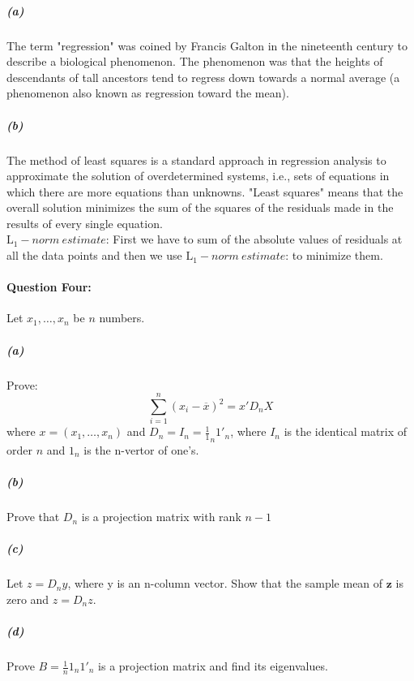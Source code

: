 \documentclass[11pt]{article}
\begin{document}
\paragraph{\color{red}{Answer:}}
  \subparagraph{(a)}
    The term "regression" was coined by Francis Galton in the nineteenth century
    to describe a biological phenomenon. The phenomenon was that the heights of
    descendants of tall ancestors tend to regress down towards a normal average
    (a phenomenon also known as regression toward the mean).
  \subparagraph{(b)}
    The method of least squares is a standard approach in regression analysis to
    approximate the solution of overdetermined systems, i.e., sets of equations in
    which there are more equations than unknowns. "Least squares" means that the
    overall solution minimizes the sum of the squares of the residuals made in the
    results of every single equation.
    \\
    $\mathrm{L}_1 - norm \ estimate$: First we have to sum of the absolute
    values of residuals at all the data points and then we use $\mathrm{L}_1 - norm \ estimate$:
     to minimize them.

\paragraph{Question Four:}
  Let $x_1, \dots, x_n$ be $n$ numbers.

  \subparagraph{(a)}
    Prove:
    \boldmath
    $$
      \sum^n_{i=1}(x_i - \overline{x})^2 ={x'D_nX}
    $$
    where ${x} = (x_1,\dots,x_n)$ and ${D_n = I_n} = \frac{1} 1_n {1'}_n$,
    where $I_n$ is the identical matrix of order $n$ and ${1_n}$ is the n-vertor
    of one's.

  \subparagraph{(b)}
    Prove that ${D_n}$ is a projection matrix with rank $n - 1$
  \subparagraph{(c)}

    Let ${z = D_ny}$, where y is an n-column vector. Show that the sample mean of $\textbf{z}$
    is zero and $z = D_nz$.
  \subparagraph{(d)}

    Prove ${B = \frac{1}{n}1_n{1'}_n}$ is a projection matrix and find its eigenvalues.
\end{document}
